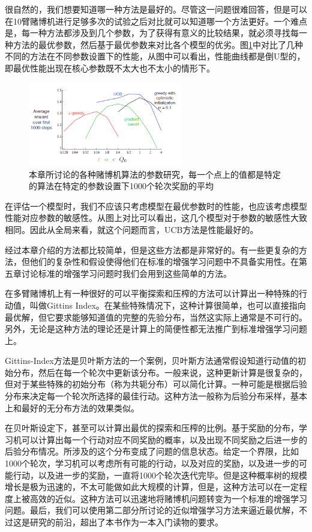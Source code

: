 \documentclass{ctexart}
\begin{document}
            很自然的，我们想要知道哪一种方法是最好的。尽管这一问题很难回答，但是可以在10臂赌博机进行足够多次的试验之后对比就可以知道哪一个方法更好。一个难点是，每一种方法都涉及到几个参数，为了获得有意义的比较结果，就必须寻找每一种方法的最优参数，然后基于最优参数来对比各个模型的优劣。图\ref{f2_6}中对比了几种不同的方法在不同参数设置下的性能，从图中可以看出，性能曲线都是倒U型的，即最优性能出现在核心参数既不太大也不太小的情形下。
            \begin{figure}
                \centering
                \includegraphics[width=0.6\textwidth]{f2-6}
                \caption{本章所讨论的各种赌博机算法的参数研究，每一个点上的值都是特定的算法在特定的参数设置下1000个轮次奖励的平均}
                \label{f2_6}
            \end{figure}
            在评估一个模型时，我们不应该只考虑模型在最优参数时的性能，也应该考虑模型性能对应参数的敏感性。从图上对比可以看出，这几个模型对于参数的敏感性大致相同。因此从全局来看，就这个问题而言，UCB方法是性能最好的。

            经过本章介绍的方法都比较简单，但是这些方法都是非常好的。有一些更复杂的方法，但他们的复杂性和假设使得他们在标准的增强学习问题中不具备实用性。在第五章讨论标准的增强学习问题时我们会用到这些简单的方法。

            在多臂赌博机上有一种很好的可以平衡探索和压榨的方法可以计算出一种特殊的行动值，叫做Gittins Index。在某些特殊情况下，这种计算很简单，也可以直接指向最优解，但它要求能够知道值的完整的先验分布，当然这实际上通常是不可行的。另外，无论是这种方法的理论还是计算上的简便性都无法推广到标准增强学习问题上。

            Gittins-Index方法是贝叶斯方法的一个案例，贝叶斯方法通常假设知道行动值的初始分布，然后在每一个轮次中更新该分布。一般来说，这种更新计算是很复杂的，但对于某些特殊的初始分布（称为共轭分布）可以简化计算。一种可能是根据后验分布来决定每一个轮次所选择的最佳行动。这种方法一般称为后验分布采样，基本上和最好的无分布方法的效果类似。

            在贝叶斯设定下，甚至可以计算出最优的探索和压榨的比例。基于奖励的分布，学习机可以计算出每一个行动对应不同奖励的概率，以及出现不同奖励之后进一步的后验分布情况。所涉及的这个分布变成了问题的信息状态。给定一个界限，比如1000个轮次，学习机可以考虑所有可能的行动，以及对应的奖励，以及进一步的可能行动，以及进一步的奖励，一直将1000个轮次迭代完毕。但是这种概率树的规模增长是极为迅速的，不太可能做如此大规模的计算，但是，这种方法可以在一定程度上被高效的近似。这种方法可以迅速地将赌博机问题转变为一个标准的增强学习问题。最后，我们可以使用第二部分所讨论的近似增强学习方法来逼近最优解，不过这是研究的前沿，超出了本书作为一本入门读物的要求。
\end{document}
